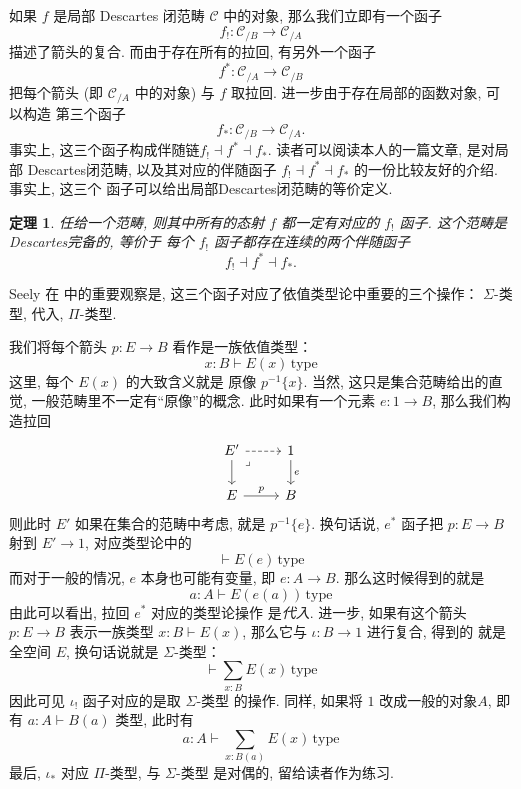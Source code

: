 \documentclass[UTF8]{ctexbook}
\theoremstyle{plain}
\newtheorem{theorem}{定理}[chapter]
\theoremstyle{definition}
\theoremstyle{remark}
\begin{document}
如果 \(f\) 是局部 Descartes 闭范畴 \(\mathcal C\)
中的对象, 那么我们立即有一个函子
\[f_! : \mathcal C_{/B} \to \mathcal C_{/A}\]
描述了箭头的复合. 而由于存在所有的拉回, 有另外一个函子
\[f^* : \mathcal C_{/A} \to \mathcal C_{/B}\]
把每个箭头 (即 \(\mathcal C_{/A}\) 中的对象) 与
\(f\) 取拉回. 进一步由于存在局部的函数对象, 可以构造
第三个函子
\[f_* : \mathcal C_{/B} \to \mathcal C_{/A}.\]
事实上, 这三个函子构成伴随链\(f_!\dashv f^*\dashv f_*\).
读者可以阅读本人的一篇文章\cite{me:2022:lccc}, 是对局部
Descartes闭范畴, 以及其对应的伴随函子 \(f_!\dashv
f^*\dashv f_*\) 的一份比较友好的介绍. 事实上, 这三个
函子可以给出局部Descartes闭范畴的等价定义.
\begin{theorem}
任给一个范畴, 则其中所有的态射 \(f\) 都一定有对应的
\(f_!\) 函子. 这个范畴是Descartes完备的, 等价于
每个 \(f_!\) 函子都存在连续的两个伴随函子
\[f_!\dashv f^*\dashv f_*.\]
\end{theorem}

Seely 在 \cite{seely:1984:lccc} 中的重要观察是,
这三个函子对应了依值类型论中重要的三个操作：
\(\Sigma\)-类型, 代入, \(\Pi\)-类型.

我们将每个箭头 \(p : E \to B\) 看作是一族依值类型：
\[x:B \vdash E(x)\,\mathrm{type}\]
这里, 每个 \(E(x)\) 的大致含义就是
原像 \(p^{-1}\{x\}\). 当然, 这只是集合范畴给出的直觉,
一般范畴里不一定有“原像”的概念. 此时如果有一个元素
\(e : 1 \to B\), 那么我们构造拉回
\[\begin{tikzcd}
  {E'} & 1 \\
  E & B
  \arrow[dashed, from=1-1, to=1-2]
  \arrow[from=1-1, to=2-1]
  \arrow["p", from=2-1, to=2-2]
  \arrow["e", from=1-2, to=2-2]
  \arrow["\lrcorner"{anchor=center, pos=0.125}, draw=none, from=1-1, to=2-2]
\end{tikzcd}\]
则此时 \(E'\) 如果在集合的范畴中考虑, 就是
\(p^{-1}\{e\}\). 换句话说, \(e^{*}\) 函子把
\(p : E \to B\) 射到 \(E' \to 1\), 对应类型论中的
\[\vdash E(e) \, \text{type}\]
而对于一般的情况, \(e\) 本身也可能有变量, 即
\(e : A \to B\). 那么这时候得到的就是
\[a : A \vdash E(e(a)) \, \text{type}\]
由此可以看出, 拉回 \(e^*\) 对应的类型论操作
是\emph{代入}. 进一步, 如果有这个箭头 \(p : E \to B\)
表示一族类型 \(x:B \vdash E(x)\),
那么它与 \(\iota : B \to 1\) 进行复合, 得到的
就是全空间 \(E\), 换句话说就是 \(\Sigma\)-类型：
\[\vdash \sum_{x:B}E(x) \, \text{type}\]
因此可见 \(\iota_!\) 函子对应的是取 \(\Sigma\)-类型
的操作. 同样, 如果将 \(1\) 改成一般的对象\(A\), 即有
\(a : A \vdash B(a)\) 类型, 此时有
\[a : A \vdash \sum_{x : B(a)} E(x)\, \text{type}\]
最后, \(\iota_*\) 对应 \(\Pi\)-类型, 与 \(\Sigma\)-类型
是对偶的, 留给读者作为练习.
\end{document}
